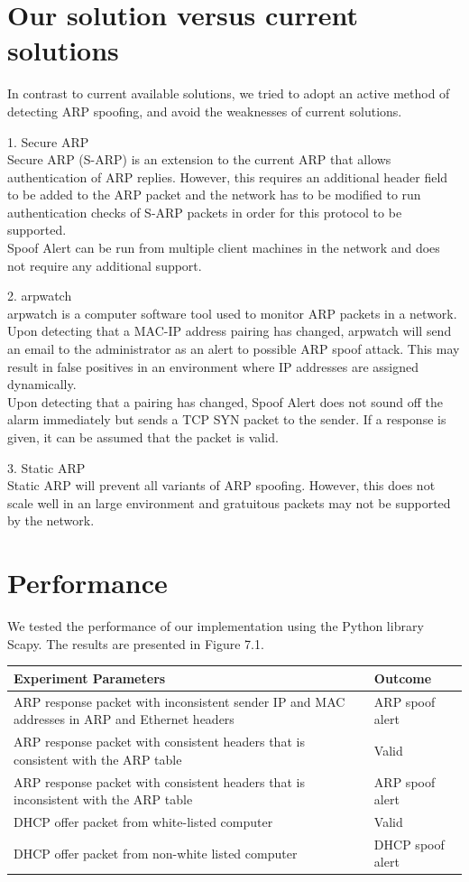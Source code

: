 \documentclass{acm_proc_article-sp}
\begin{document}
\section{Our solution versus current \\solutions}
In contrast to current available solutions, we tried to adopt an active method of detecting ARP spoofing, and avoid the weaknesses of current solutions.  

1. Secure ARP\\
Secure ARP (S-ARP) is an extension to the current ARP that allows authentication of ARP replies. However, this requires an additional header field to be added to the ARP packet and the network has to be modified to run authentication checks of S-ARP packets in order for this protocol to be supported. \\
Spoof Alert can be run from multiple client machines in the network and does not require any additional support.

2. arpwatch \\
arpwatch is a computer software tool used to monitor ARP packets in a network. Upon detecting that a MAC-IP address pairing has changed, arpwatch will send an email to the administrator as an alert to possible ARP spoof attack. This may result in false positives in an environment where IP addresses are assigned dynamically. \\
Upon detecting that a pairing has changed, Spoof Alert does not sound off the alarm immediately but sends a TCP SYN packet to the sender. If a response is given, it can be assumed that the packet is valid.

3. Static ARP \\ 
Static ARP will prevent all variants of ARP spoofing. However, this does not scale well in an large environment and gratuitous packets may not be supported by the network.

\section{Performance}
We tested the performance of our implementation using the Python library Scapy. The results are presented in Figure 7.1.

\begin{tabular}{ |m{15em}|m{7em}| }
\hline 
Experiment Parameters & Outcome \\
\hline 
 ARP response packet with inconsistent sender IP and MAC addresses in ARP and Ethernet headers & ARP spoof alert \\ 
\hline
 ARP response packet with consistent headers that is consistent with the ARP table &  Valid \\  
\hline
 ARP response packet with consistent headers that is inconsistent with the ARP table & ARP spoof alert \\
\hline
DHCP offer packet from white-listed computer & Valid \\
\hline
DHCP offer packet from non-white listed computer & DHCP spoof alert \\
\hline      
\end{tabular}
\end{document}
